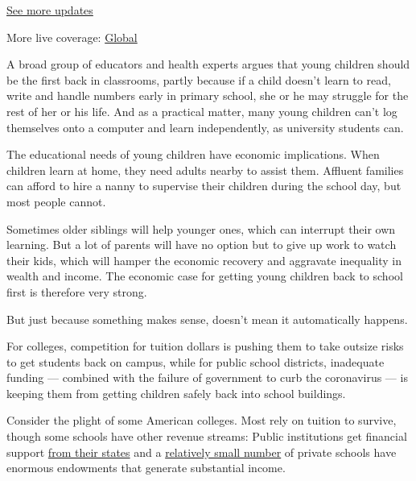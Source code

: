 \href{https://www.nytimes3xbfgragh.onion/live/2020/08/04/business/stock-market-today-coronavirus?action=click\&pgtype=Article\&state=default\&region=MAIN_CONTENT_1\&context=storylines_live_updates}{See
more updates}

More live coverage:
\href{https://www.nytimes3xbfgragh.onion/2020/08/04/world/coronavirus-cases.html?action=click\&pgtype=Article\&state=default\&region=MAIN_CONTENT_1\&context=storylines_live_updates}{Global}

A broad group of educators and health experts argues that young children
should be the first back in classrooms, partly because if a child
doesn't learn to read, write and handle numbers early in primary school,
she or he may struggle for the rest of her or his life. And as a
practical matter, many young children can't log themselves onto a
computer and learn independently, as university students can.

The educational needs of young children have economic implications. When
children learn at home, they need adults nearby to assist them. Affluent
families can afford to hire a nanny to supervise their children during
the school day, but most people cannot.

Sometimes older siblings will help younger ones, which can interrupt
their own learning. But a lot of parents will have no option but to give
up work to watch their kids, which will hamper the economic recovery and
aggravate inequality in wealth and income. The economic case for getting
young children back to school first is therefore very strong.

But just because something makes sense, doesn't mean it automatically
happens.

For colleges, competition for tuition dollars is pushing them to take
outsize risks to get students back on campus, while for public school
districts, inadequate funding --- combined with the failure of
government to curb the coronavirus --- is keeping them from getting
children safely back into school buildings.

Consider the plight of some American colleges. Most rely on tuition to
survive, though some schools have other revenue streams: Public
institutions get financial support
\href{https://research.collegeboard.org/trends/college-pricing/figures-tables/total-and-student-state-and-local-funding-and-public-enrollment-over-time}{from
their states} and a
\href{https://research.collegeboard.org/pdf/2019-trendsincp-fig-19.pdf}{relatively
small number} of private schools have enormous endowments that generate
substantial income.

